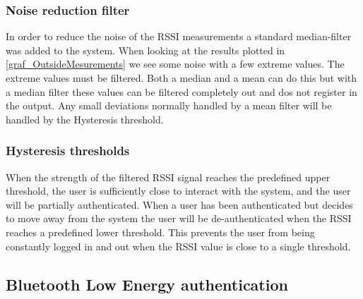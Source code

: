 

\subsubsection{Noise reduction filter}
In order to reduce the noise of the RSSI measurements a standard median-filter was added to the system.
When looking at the results plotted in \cref{graf_OutsideMesurements} we see some noise with a few extreme values.
The extreme values must be filtered. Both a median and a mean can do this but with a median filter these values can be filtered completely out and dos not register in the output. Any small deviations normally handled by a mean filter will be handled by the Hysteresis threshold.

\subsubsection{Hysteresis thresholds}
When the strength of the filtered RSSI signal reaches the predefined upper threshold, the user is sufficiently close to interact with the system, and the user will be partially authenticated.
When a user has been authenticated but decides to move away from the system the user will be de-authenticated when the RSSI reaches a predefined lower threshold.
This prevents the user from being constantly logged in and out when the RSSI value is close to a single threshold.

\subsection{Bluetooth Low Energy authentication}

